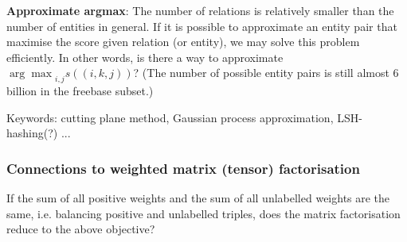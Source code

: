 \documentclass{article}
\theoremstyle{definition}
\begin{document}
\textbf{Approximate argmax}: The number of relations is relatively smaller than the number of entities in general. If it is possible to approximate an entity pair that maximise the score given relation (or entity), we may solve this problem efficiently. In other words, is there a way to approximate ${\arg\max}_{i,j}s((i,k,j))$? (The number of possible entity pairs is still almost 6 billion in the freebase subset.)

Keywords: cutting plane method, Gaussian process approximation, LSH-hashing(?) ...

\subsubsection{Connections to weighted matrix (tensor) factorisation}
If the sum of all positive weights and the sum of all unlabelled weights are the same, i.e. balancing positive and unlabelled triples, does the matrix factorisation reduce to the above objective?



\end{document}
